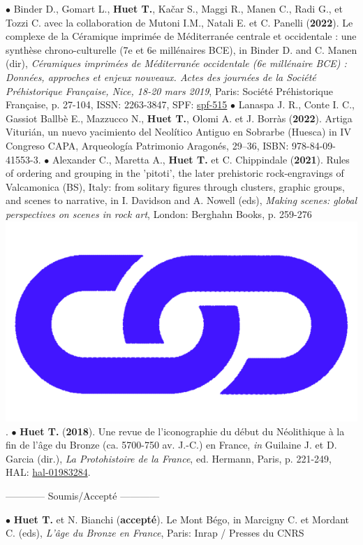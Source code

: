 \documentclass{article}
\newcommand{\fr}[1]{#1}       %
\newcommand{\en}[1]{}     %
\begin{document}
$\bullet$ Binder D., Gomart L., \textbf{Huet T.}, Ka{\v{c}}ar S., Maggi R., Manen C., Radi G., et Tozzi C. avec la collaboration de Mutoni I.M., Natali E. et C. Panelli (\textbf{2022}). Le complexe de la C\'{e}ramique imprim\'{e}e de M\'{e}diterran\'{e}e centrale et occidentale : une synthèse chrono-culturelle (7e et 6e millénaires BCE), in Binder D. and C. Manen (dir), \textit{C\'{e}ramiques imprim\'{e}es de M\'{e}diterran\'{e}e occidentale (6e mill\'{e}naire BCE) : Donn\'{e}es, approches et enjeux nouveaux. Actes des journ\'{e}es de la Soci\'{e}t\'{e} Pr\'{e}historique Fran\c{c}aise, Nice, 18-20 mars 2019}, Paris: Soci\'{e}t\'{e} Pr\'{e}historique Fran\c{c}aise, p. 27-104, ISSN: 2263-3847, SPF: \href{https://www.prehistoire.org/515_p_57657/accEs-libre-seance-18-ceramiques-imprimees-de-mediterranee-occidentale.html}{spf-515}
\smallbreak
$\bullet$ Lanaspa J. R., Conte I. C., Gassiot Ballbè E., Mazzucco N., \textbf{Huet T.}, Olomi A. et J. Borràs (\textbf{2022}). Artiga Viturián, un nuevo yacimiento del Neolítico Antiguo en Sobrarbe (Huesca) in IV Congreso CAPA, Arqueología Patrimonio Aragonés, 29–36, ISBN: 978-84-09-41553-3.
\smallbreak
$\bullet$ Alexander C., Maretta A., \textbf{Huet T.} et C. Chippindale (\textbf{2021}). Rules of ordering and grouping in the 'pitoti', the later prehistoric rock-engravings of Valcamonica (BS), Italy: from solitary figures through clusters, graphic groups, and scenes to narrative, in I. Davidson and A. Nowell (eds), \textit{Making scenes: global perspectives on scenes in rock art}, London: Berghahn Books, p. 259-276 \href{https://www.berghahnbooks.com/title/DavidsonMaking}{\includegraphics[scale=0.015]{link_darkblue.png}}.
\smallbreak
$\bullet$ \textbf{Huet T.} (\textbf{2018}). Une revue de l'iconographie du d\'{e}but du N\'{e}olithique \`{a} la fin de l'\^{a}ge du Bronze (ca. 5700-750 av. J.-C.) en France, \textit{in} Guilaine J. et D. Garcia (dir.), \textit{La Protohistoire de la France}, ed. Hermann, Paris, p. 221-249, HAL: \href{https://hal.archives-ouvertes.fr/hal-01983284}{hal-01983284}.
\smallbreak
\fr{\begin{center}------------ Soumis/Accepté ------------\end{center}}\en{{\begin{center}------------ Submitted/Accepted ------------\end{center}}}
\smallbreak
$\bullet$ \textbf{Huet T.} et N. Bianchi (\textbf{accepté}). Le Mont Bégo, in Marcigny C. et Mordant C. (eds), \textit{L'âge du Bronze en France}, Paris: Inrap / Presses du CNRS
\end{document}
